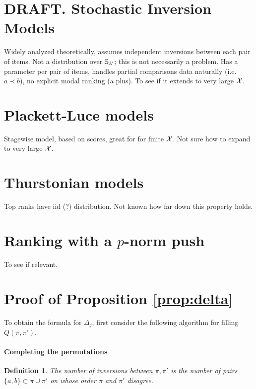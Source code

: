 \documentclass[10pt]{article}
\newtheorem{definition}[prop]{Definition}
\begin{document}







\section{DRAFT. Stochastic Inversion Models}
\label{sec:stoch-i-m}
Widely analyzed theoretically, assumes independent inversions between each pair of items. Not a distribution over ${\mathbb S}_{{\mathcal X}}$; this is not necessarily a problem. Has a parameter per pair of items, handles partial comparisons data naturally (i.e. $a \prec b$), no explicit modal ranking (a plus). To see if it extends to very large ${\mathcal X}$. 


\section{Plackett-Luce models}
\label{sec:pl}
Stagewise model, based on scores, great for \topt for finite ${\mathcal X}$. Not sure how to expand to very large ${\mathcal X}$. 

\section{Thurstonian models}
\label{sec:thurst}
Top ranks have iid (?) distribution. Not known how far down this property holds.
\section{Ranking with a $p$-norm push}
\label{sec:push}
To see if relevant.

\appendix
\section{Proof of Proposition \ref{prop:delta}}

To obtain the formula for $\Delta_j$, first consider the following algorithm for filling $Q(\pi,\pi')$.

\paragraph{Completing the permutations}
\begin{definition}
The number of inversions between $\pi,\pi'$ is the number of pairs $\{a,b\}\subset \pi \cup \pi'$ on whose order $\pi$ and $\pi'$ disagree. 
\end{definition}
\end{document}
